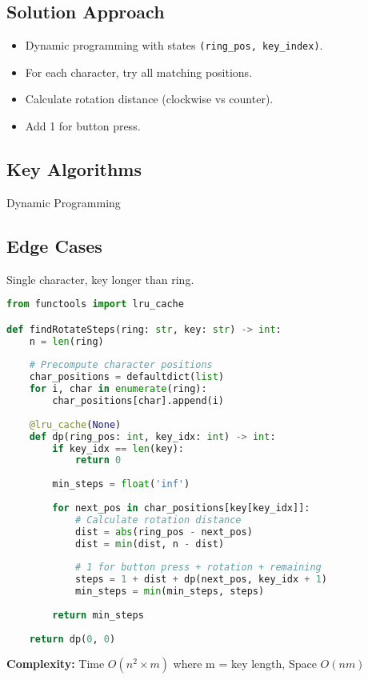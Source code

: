 \documentclass[10pt, a4paper]{article}
\begin{document}
\subsection*{Solution Approach}
\begin{itemize}
    \item Dynamic programming with states \texttt{(ring\_pos, key\_index)}.
    \item For each character, try all matching positions.
    \item Calculate rotation distance (clockwise vs counter).
    \item Add 1 for button press.
\end{itemize}

\subsection*{Key Algorithms}
Dynamic Programming

\subsection*{Edge Cases}
Single character, key longer than ring.

\begin{lstlisting}[language=Python]
from functools import lru_cache

def findRotateSteps(ring: str, key: str) -> int:
    n = len(ring)
    
    # Precompute character positions
    char_positions = defaultdict(list)
    for i, char in enumerate(ring):
        char_positions[char].append(i)
    
    @lru_cache(None)
    def dp(ring_pos: int, key_idx: int) -> int:
        if key_idx == len(key):
            return 0
        
        min_steps = float('inf')
        
        for next_pos in char_positions[key[key_idx]]:
            # Calculate rotation distance
            dist = abs(ring_pos - next_pos)
            dist = min(dist, n - dist)
            
            # 1 for button press + rotation + remaining
            steps = 1 + dist + dp(next_pos, key_idx + 1)
            min_steps = min(min_steps, steps)
        
        return min_steps
    
    return dp(0, 0)
\end{lstlisting}
\textbf{Complexity:} Time $O(n^2 \times m)$ where m = key length, Space $O(nm)$
\end{document}
